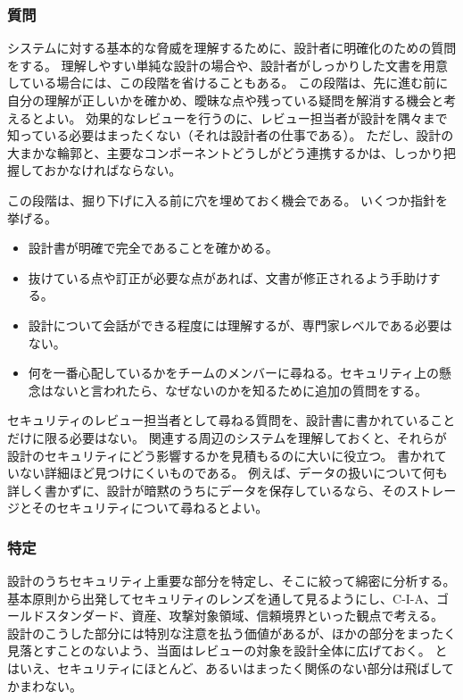 \documentclass[uplatex]{jsarticle}
\begin{document}
\subsubsection{質問}

システムに対する基本的な脅威を理解するために、設計者に明確化のための質問をする。
理解しやすい単純な設計の場合や、設計者がしっかりした文書を用意している場合には、この段階を省けることもある。
この段階は、先に進む前に自分の理解が正しいかを確かめ、曖昧な点や残っている疑問を解消する機会と考えるとよい。
効果的なレビューを行うのに、レビュー担当者が設計を隅々まで知っている必要はまったくない（それは設計者の仕事である）。
ただし、設計の大まかな輪郭と、主要なコンポーネントどうしがどう連携するかは、しっかり把握しておかなければならない。

この段階は、掘り下げに入る前に穴を埋めておく機会である。
いくつか指針を挙げる。
\begin{itemize}
\item 設計書が明確で完全であることを確かめる。
\item 抜けている点や訂正が必要な点があれば、文書が修正されるよう手助けする。
\item 設計について会話ができる程度には理解するが、専門家レベルである必要はない。
\item 何を一番心配しているかをチームのメンバーに尋ねる。セキュリティ上の懸念はないと言われたら、なぜないのかを知るために追加の質問をする。
\end{itemize}

セキュリティのレビュー担当者として尋ねる質問を、設計書に書かれていることだけに限る必要はない。
関連する周辺のシステムを理解しておくと、それらが設計のセキュリティにどう影響するかを見積もるのに大いに役立つ。
書かれていない詳細ほど見つけにくいものである。
例えば、データの扱いについて何も詳しく書かずに、設計が暗黙のうちにデータを保存しているなら、そのストレージとそのセキュリティについて尋ねるとよい。

\subsubsection{特定}

設計のうちセキュリティ上重要な部分を特定し、そこに絞って綿密に分析する。
基本原則から出発してセキュリティのレンズを通して見るようにし、C-I-A、ゴールドスタンダード、資産、攻撃対象領域、信頼境界といった観点で考える。
設計のこうした部分には特別な注意を払う価値があるが、ほかの部分をまったく見落とすことのないよう、当面はレビューの対象を設計全体に広げておく。
とはいえ、セキュリティにほとんど、あるいはまったく関係のない部分は飛ばしてかまわない。
\end{document}
